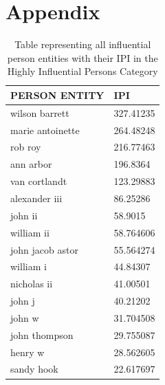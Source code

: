 \documentclass[letterpaper,11pt]{report}
\begin{document}
 

 



%

%
%


\chapter*{Appendix}\label{chapter:appendix} 

\begin{table}[h]
\centering
\begin{tabular}{|l|l|}
\hline
\textbf{PERSON ENTITY}    &       \textbf{IPI}    \\ \hline
wilson barrett   & 327.41235 \\ \hline
marie antoinette & 264.48248 \\ \hline
rob roy          & 216.77463 \\ \hline
ann arbor        & 196.8364  \\ \hline
van cortlandt    & 123.29883 \\ \hline
alexander iii    & 86.25286  \\ \hline
john ii          & 58.9015   \\ \hline
william ii       & 58.764606 \\ \hline
john jacob astor & 55.564274 \\ \hline
william i        & 44.84307  \\ \hline
nicholas ii      & 41.00501  \\ \hline
john j           & 40.21202  \\ \hline
john w           & 31.704508 \\ \hline
john thompson    & 29.755087 \\ \hline
henry w          & 28.562605 \\ \hline
sandy hook       & 22.617697 \\ \hline
\end{tabular}
\caption{Table representing all influential person entities with their IPI in the Highly Influential Persons Category}
\label{table:app1}
\end{table}
\end{document}
